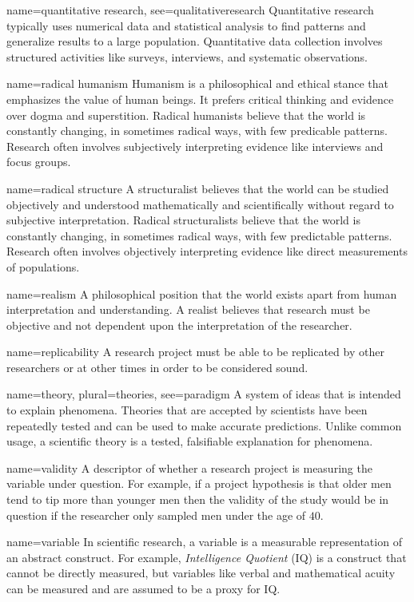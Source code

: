 {name={quantitative research},
	see={qualitativeresearch}}
{%
	Quantitative research typically uses numerical data and statistical analysis to find patterns and generalize results to a large population. Quantitative data collection involves structured activities like surveys, interviews, and systematic observations.
}

{name={radical humanism}}
{%
	Humanism is a philosophical and ethical stance that emphasizes the value of human beings. It prefers critical thinking and evidence over dogma and superstition. Radical humanists believe that the world is constantly changing, in sometimes radical ways, with few predicable patterns. Research often involves subjectively interpreting evidence like interviews and focus groups.
}

{name={radical structure}}
{%
	A structuralist believes that the world can be studied objectively and understood mathematically and scientifically without regard to subjective interpretation. Radical structuralists believe that the world is constantly changing, in sometimes radical ways, with few predictable patterns. Research often involves objectively interpreting evidence like direct measurements of populations.
}

{name={realism}}
{%
	A philosophical position that the world exists apart from human interpretation and understanding. A realist believes that research must be objective and not dependent upon the interpretation of the researcher.
}

	{name={replicability}}
	{%
		A research project must be able to be replicated by other researchers or at other times in order to be considered sound.
	}

{name={theory},
	plural={theories},
	see={paradigm}}
{%
	A system of ideas that is intended to explain phenomena. Theories that are accepted by scientists have been repeatedly tested and can be used to make accurate predictions. Unlike common usage, a scientific theory is a tested, falsifiable explanation for phenomena.
}

{name={validity}}
{%
	A descriptor of whether a research project is measuring the variable under question. For example, if a project hypothesis is that older men tend to tip more than younger men then the validity of the study would be in question if the researcher only sampled men under the age of $ 40 $.
}

{name={variable}}
{%
	In scientific research, a variable is a measurable representation of an abstract construct. For example, \textit{Intelligence Quotient} (IQ) is a construct that cannot be directly measured, but variables like verbal and mathematical acuity can be measured and are assumed to be a proxy for IQ.
}
